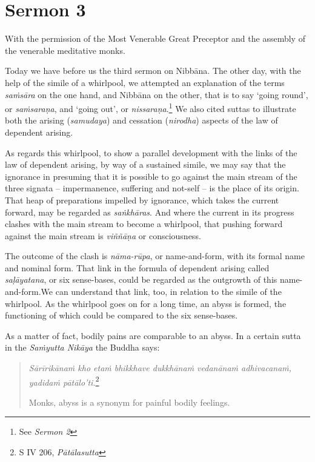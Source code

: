 \chapter{Sermon 3}

\NibbanaOpeningQuote

With the permission of the Most Venerable Great Preceptor and the assembly of the venerable meditative monks.

Today we have before us the third sermon on Nibbāna. The other day, with the help of the simile of a whirlpool, we attempted an explanation of the terms \emph{saṁsāra} on the one hand, and Nibbāna on the other, that is to say `going round', or \emph{saṁsaraṇa}, and `going out', or \emph{nissaraṇa}.\footnote{See \emph{Sermon 2}} We also cited suttas to illustrate both the arising (\emph{samudaya}) and cessation (\emph{nirodha}) aspects of the law of dependent arising.

As regards this whirlpool, to show a parallel development with the links of the law of dependent arising, by way of a sustained simile, we may say that the ignorance in presuming that it is possible to go against the main stream of the three signata -- impermanence, suffering and not-self -- is the place of its origin. That heap of preparations impelled by ignorance, which takes the current forward, may be regarded as \emph{saṅkhāras}. And where the current in its progress clashes with the main stream to become a whirlpool, that pushing forward against the main stream is \emph{viññāṇa} or consciousness.

The outcome of the clash is \emph{nāma-rūpa}, or name-and-form, with its formal name and nominal form. That link in the formula of dependent arising called \emph{saḷāyatana}, or six sense-bases, could be regarded as the outgrowth of this name-and-form.We can understand that link, too, in relation to the simile of the whirlpool. As the whirlpool goes on for a long time, an abyss is formed, the functioning of which could be compared to the six sense-bases.

As a matter of fact, bodily pains are comparable to an abyss. In a certain sutta in the \emph{Saṁyutta Nikāya} the Buddha says:

\begin{quote}
\emph{Sārīrikānaṁ kho etaṁ bhikkhave dukkhānaṁ vedanānaṁ adhivacanaṁ, yadidaṁ pātālo'ti.}\footnote{S IV 206, \emph{Pātālasutta}}

Monks, abyss is a synonym for painful bodily feelings.
\end{quote}

